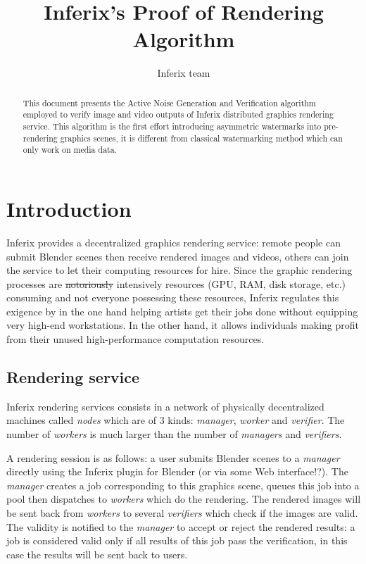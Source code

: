 \documentclass[a4paper,11pt,onecolumn]{memoir}
\author{
    Inferix team
}
\title{Inferix's Proof of Rendering Algorithm}
\begin{document}

\frontmatter

\maketitle

\begin{abstract}
    This document presents the Active Noise Generation and Verification algorithm employed to verify image and video outputs of Inferix distributed graphics rendering service. This algorithm is the first effort introducing asymmetric watermarks into pre-rendering graphics scenes, it is different from classical watermarking method which can only work on media data.
\end{abstract}
\clearpage

\tableofcontents*
\clearpage

\mainmatter

\chapter{Introduction}
Inferix provides a decentralized graphics rendering service: remote people can submit Blender scenes then receive rendered images and videos, others can join the service to let their computing resources for hire. Since the graphic rendering processes are \sout{notoriously} intensively resources (GPU, RAM, disk storage, etc.) consuming and not everyone possessing these resources, Inferix regulates this exigence by in the one hand helping artists get their jobs done without equipping very high-end workstations. In the other hand, it allows individuals making profit from their unused high-performance computation resources.


\section[Rendering service]{Rendering service}
Inferix rendering services consists in a network of physically decentralized machines called \emph{nodes} which are of $3$ kinds: \emph{manager}, \emph{worker} and \emph{verifier}. The number of \emph{workers} is much larger than the number of \emph{managers} and \emph{verifiers}.

A rendering session is as follows: a user submits Blender scenes to a \emph{manager} directly using the Inferix plugin for Blender (or via some Web interface!?). The \emph{manager} creates a job corresponding to this graphics scene, queues this job into a pool then dispatches to \emph{workers} which do the rendering. The rendered images will be sent back from \emph{workers} to several \emph{verifiers} which check if the images are valid. The validity is notified to the \emph{manager} to accept or reject the rendered results: a job is considered valid only if all results of this job pass the verification, in this case the results will be sent back to users.
\end{document}
